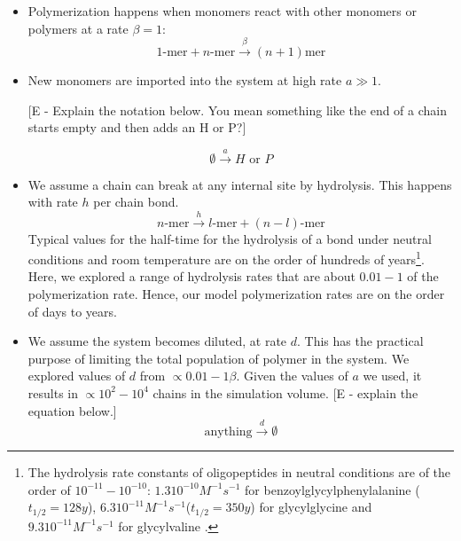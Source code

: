 \documentclass[5p,times]{elsarticle}
\begin{document}
\begin{itemize}
 \item Polymerization happens when monomers react with other monomers or polymers at a rate $\beta 
= 1$:
\begin{equation}
 1\mbox{-mer}+n\mbox{-mer} \xrightarrow{\beta} (n+1)\mbox{mer}
\end{equation}


\item New monomers are imported into the system at high rate $a\gg1$. 

[E - Explain the notation below.  You mean something like the end of a chain starts empty and then 
adds an H or P?]

\begin{equation}
 \emptyset \xrightarrow{a} H\,\,\mbox{or}\,\,P
\end{equation}

\item We assume a chain can break at any internal site by hydrolysis.  This happens with rate $h$ 
per chain bond. 
\begin{equation}
 n\mbox{-mer} \xrightarrow{h} l\mbox{-mer}+(n-l)\mbox{-mer}
\end{equation}
Typical values for the half-time for the hydrolysis of a bond under neutral conditions and room 
temperature are on the order of hundreds of years\footnote{The hydrolysis rate constants of 
oligopeptides in neutral conditions are of the order of $10^{-11}-10^{-10}$: $1.3  10^{-10} 
M^{-1}s^{-1} $ for benzoylglycylphenylalanine ($t_{1/2} = 128 y$)\cite{Bryant1996}, $6.3  10^{-11} 
M^{-1} s^{-1}$($t_{1/2}=350 y$) for glycylglycine and $9.3 10^{-11}M^{-1} s^{-1}$ for glycylvaline
\cite{Smith1998}.}. Here, we explored a range of hydrolysis rates that are about $0.01-1$ of the 
polymerization rate.  Hence, our model polymerization rates are on the order of days to years.

\item We assume the system becomes diluted, at rate $d$.  This has the practical purpose of 
limiting the total population of polymer in the system.  We explored values of $d$ from $\propto 
0.01- 1\beta$.  Given the values of $a$ we used, it results in $\propto 10^2- 10^4$ chains in the 
simulation volume.  [E - explain the equation below.]
\begin{equation}
 \mbox{anything} \xrightarrow{d}\emptyset
\end{equation}


\end{itemize}
\end{document}
